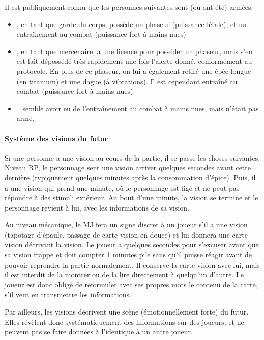 {	%
	\par Il est publiquement connu que les personnes suivantes sont (ou ont été) armées:
	\begin{itemize}
		\item \nmPlayerVIII, en tant que garde du corps, possède un phaseur (puissance létale), et un entraînement au combat (puissance fort à mains nues)
		\item \nmPlayerX, en tant que mercenaire, a une licence pour posséder un phaseur, mais s'en est fait dépossédé très rapidement une fois l'alerte donné, conformément au protocole. En plus de ce phaseur, on lui a également retiré une épée longue (en titanium) et une dague (à vibrations). Il est cependant entraîné au combat (puissance fort à mains nues).
		\item \nmPlayerXI ~ semble avoir eu de l'entraînement au combat à mains nues, mais n'était pas armé.
	\end{itemize}
	
	
	\paragraph{Système des visions du futur} Si une personne a une vision au cours de la partie, il se passe les choses suivantes. Niveau RP, le personnage sent une vision arriver quelques secondes avant cette dernière (typiquement quelques minutes après la consommation d'épice). Puis, il a une vision qui prend une minute, où le personnage est figé et ne peut pas répondre à des stimuli extérieur. Au bout d'une minute, la vision se termine et le personnage revient à lui, avec les informations de sa vision.
	
	\par Au niveau mécanique, le MJ fera un signe discret à un joueur s'il a une vision (tapotage d'épaule, passage de carte vision en douce) et lui donnera une carte vision décrivant la vision. Le joueur a quelques secondes pour s'excuser avant que sa vision frappe et doit compter 1 minutes pile sans qu'il puisse réagir avant de pouvoir reprendre la partie normalement. Il conserve la carte vision avec lui, mais il est interdit de la montrer ou de la lire directement à quelqu'un d'autre. Le joueur est donc obligé de reformuler avec ses propres mots le contenu de la carte, s'il veut en transmettre les informations.
	
	\par Par ailleurs, les visions décrivent une scène (émotionnellement forte) du futur. Elles révèlent donc systématiquement des informations sur des joueurs, et ne peuvent pas se faire données à l'identique à un autre joueur.
}



